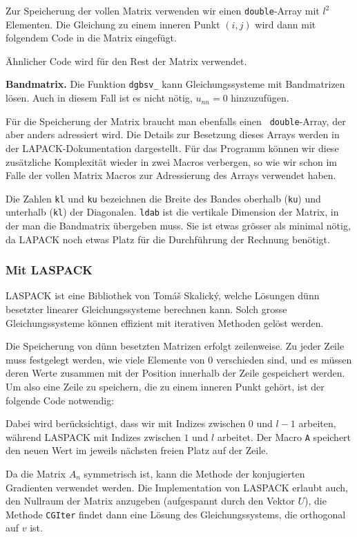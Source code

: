 Zur Speicherung der vollen Matrix verwenden wir einen {\tt double}-Array mit $l^2$ Elementen.
Die Gleichung zu einem inneren Punkt $(i,j)$ wird dann mit folgendem Code 
in die Matrix eingefügt.

Ähnlicher Code wird für den Rest der Matrix verwendet.

\medskip
{\parindent0pt
{\bf Bandmatrix.}}
Die Funktion {\tt dgbsv\_} kann Gleichungssysteme mit Bandmatrizen
lösen. Auch in diesem Fall ist es nicht nötig, $u_{nn}=0$ hinzuzufügen.

Für die Speicherung der Matrix braucht man ebenfalls einen {\tt
double}-Array, der aber anders adressiert wird. Die Details zur Besetzung
dieses Arrays werden in der LAPACK-Dokumentation dargestellt. Für das
Programm können wir diese zusätzliche Komplexität wieder in zwei
Macros verbergen, so wie wir schon im Falle der vollen Matrix Macros
zur Adressierung des Arrays verwendet haben.

Die Zahlen {\tt kl} und {\tt ku} bezeichnen die Breite des Bandes oberhalb
({\tt ku}) und unterhalb ({\tt kl}) der Diagonalen. {\tt ldab} ist die
vertikale Dimension der Matrix, in der man die Bandmatrix übergeben
muss. Sie ist etwas grösser als minimal nötig, da LAPACK noch etwas
Platz für die Durchführung der Rechnung benötigt.

\subsubsection{Mit LASPACK}
LASPACK ist eine Bibliothek von Tom\'a\v s Skalick\'y, welche Lösungen
dünn besetzter linearer Gleichungssysteme berechnen kann. Solch grosse
Gleichungssysteme können effizient mit iterativen Methoden gelöst
werden.

Die Speicherung von dünn besetzten Matrizen erfolgt zeilenweise. Zu
jeder Zeile muss festgelegt werden, wie viele Elemente von 0 verschieden
sind, und es müssen deren Werte zusammen mit der Position innerhalb
der Zeile gespeichert werden.  Um also eine Zeile zu speichern, die zu
einem inneren Punkt gehört, ist der folgende Code notwendig:

Dabei wird berücksichtigt, dass wir mit Indizes zwischen $0$ und $l-1$
arbeiten, während LASPACK mit Indizes zwischen $1$ und $l$ arbeitet. Der
Macro {\tt A} speichert den neuen Wert im jeweils nächsten freien Platz
auf der Zeile.

Da die Matrix $A_n$ symmetrisch ist, kann die Methode der konjugierten
Gradienten verwendet werden.  Die Implementation von LASPACK erlaubt
auch, den Nullraum der Matrix anzugeben (aufgespannt durch den Vektor $U$),
die Methode {\tt CGIter} findet dann eine Lösung
des Gleichungssystems, die orthogonal auf $v$ ist.

